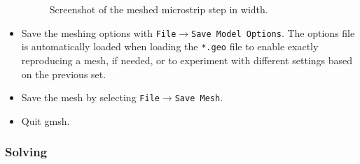 \documentclass[titlepage]{article}
\renewcommand\_{\textunderscore\linebreak[1]}
\begin{document}
\begin{itemize}
\begin{figure}
  \caption{Screenshot of the meshed microstrip step in width.}
  \label{fig:microstrip_mesh}
\end{figure}
\item Save the meshing options with \texttt{File}$\rightarrow$\texttt{Save Model Options}.  The options file is automatically loaded when loading the \texttt{*.geo} file to enable exactly reproducing a mesh, if needed, or to experiment with different settings based on the previous set.
\item Save the mesh by selecting \texttt{File}$\rightarrow$\texttt{Save Mesh}.
\item Quit gmsh.
\end{itemize}

\subsubsection{Solving}
\end{document}
